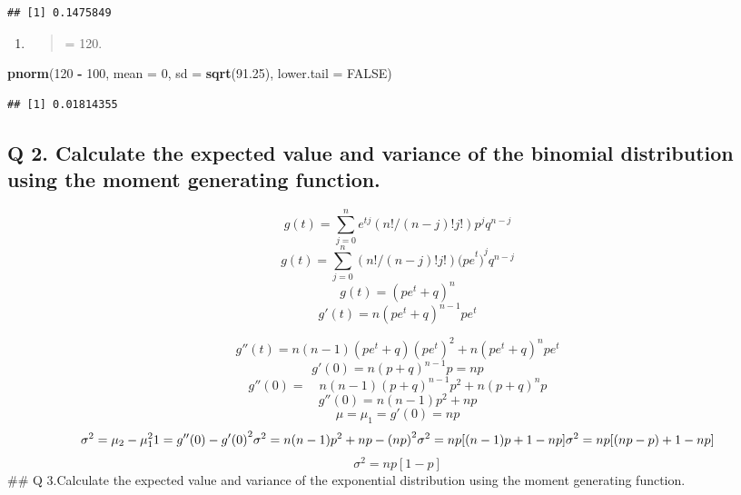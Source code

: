 \documentclass[]{article}
\newenvironment{Shaded}{\begin{snugshade}}{\end{snugshade}}
\newcommand{\KeywordTok}[1]{\textcolor[rgb]{0.13,0.29,0.53}{\textbf{#1}}}
\newcommand{\DataTypeTok}[1]{\textcolor[rgb]{0.13,0.29,0.53}{#1}}
\newcommand{\DecValTok}[1]{\textcolor[rgb]{0.00,0.00,0.81}{#1}}
\newcommand{\FloatTok}[1]{\textcolor[rgb]{0.00,0.00,0.81}{#1}}
\newcommand{\StringTok}[1]{\textcolor[rgb]{0.31,0.60,0.02}{#1}}
\newcommand{\OtherTok}[1]{\textcolor[rgb]{0.56,0.35,0.01}{#1}}
\newcommand{\OperatorTok}[1]{\textcolor[rgb]{0.81,0.36,0.00}{\textbf{#1}}}
\newcommand{\NormalTok}[1]{#1}
\begin{document}
\begin{verbatim}
## [1] 0.1475849
\end{verbatim}

\begin{enumerate}
\def\labelenumi{(\alph{enumi})}
\setcounter{enumi}{2}
\item
  \begin{quote}
  = 120.
  \end{quote}
\end{enumerate}

\begin{Shaded}
\begin{Highlighting}[]
\KeywordTok{pnorm}\NormalTok{(}\DecValTok{120} \OperatorTok{-}\StringTok{ }\DecValTok{100}\NormalTok{, }\DataTypeTok{mean =} \DecValTok{0}\NormalTok{, }\DataTypeTok{sd =} \KeywordTok{sqrt}\NormalTok{(}\FloatTok{91.25}\NormalTok{), }\DataTypeTok{lower.tail =} \OtherTok{FALSE}\NormalTok{)}
\end{Highlighting}
\end{Shaded}

\begin{verbatim}
## [1] 0.01814355
\end{verbatim}

\subsection{Q 2. Calculate the expected value and variance of the
binomial distribution using the moment generating
function.}\label{q-2.-calculate-the-expected-value-and-variance-of-the-binomial-distribution-using-the-moment-generating-function.}

\[g(t)=\sum _{ j=0 }^{ n }{ { e }^{ tj } } (n!/(n-j)!j!){ p }^{ j }{ q }^{ n-j }\]
\[g(t)=\sum _{ j=0 }^{ n }{ (n!/(n-j)!j!) } { { (pe }^{ t }) }^{ j }{ q }^{ n-j }\]
\[g(t)={ ({ pe }^{ t }+q) }^{ n }\]
\[g'(t)=n{ ({ pe }^{ t }+q) }^{ n-1 }{ pe }^{ t }\]

\[g''(t)=n(n-1)({ pe }^{ t }+q){ ({ pe }^{ t }) }^{ 2 }+n{ ({ pe }^{ t }+q) }^{ n }{ pe }^{ t }  \]
\[g'(0)={ n(p+q) }^{ n-1 }p=np\]
\[g''(0)=\quad { n(n-1)(p+q) }^{ n-1 }{ p }^{ 2 }+{ n(p+q) }^{ n }p\]
\[g''(0)=n(n-1){ p }^{ 2 }+np\] \[\mu ={ \mu  }_{ 1 }=g'(0)=np\]
\[{ \sigma  }^{ 2 }={ \mu  }_{ 2 }-{ \mu  }_{ 1 }^{ 2 }1=g''(0)-{ g'(0) }^{ 2 }\\ { \sigma  }^{ 2 }=n(n-1){ p }^{ 2 }+np-{ (np) }^{ 2 }\\ { \sigma  }^{ 2 }=np[(n-1)p+1-np]\\ { \sigma  }^{ 2 }=np[(np-p)+1-np]\]
\[{ \sigma  }^{ 2 }=np[1-p]\] \#\# Q 3.Calculate the expected value and
variance of the exponential distribution using the moment generating
function.
\end{document}
